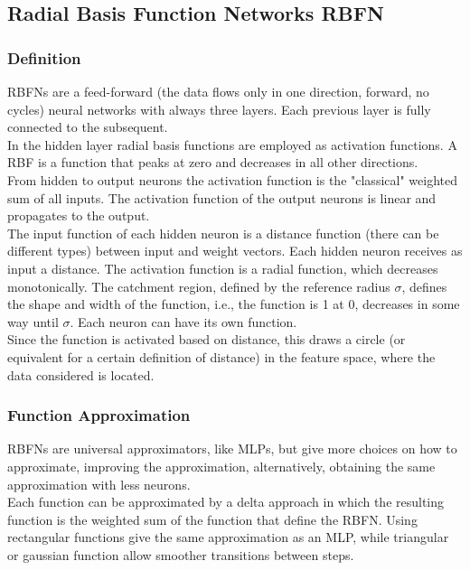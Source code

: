 \subsection{Radial Basis Function Networks RBFN}

\subsubsection{Definition}
RBFNs are a feed-forward (the data flows only in one direction, forward, no cycles) neural networks with always three layers. Each previous layer is fully connected to the subsequent.\\
In the hidden layer radial basis functions are employed as activation functions. A RBF is a function that peaks at zero and decreases in all other directions.\\

From hidden to output neurons the activation function is the "classical" weighted sum of all inputs. The activation function of the output neurons is linear and propagates to the output.\\ 

The input function of each hidden neuron is a distance function (there can be different types) between input and weight vectors. Each hidden neuron receives as input a distance. The activation function is a radial function, which decreases monotonically. The catchment region, defined by the reference radius $\sigma$, defines the shape and width of the function, i.e., the function is 1 at 0, decreases in some way until $\sigma$. Each neuron can have its own function.\\ 
Since the function is activated based on distance, this draws a circle (or equivalent for a certain definition of distance) in the feature space, where the data considered is located.\\

\subsubsection{Function Approximation}
RBFNs are universal approximators, like MLPs, but give more choices on how to approximate, improving the approximation, alternatively, obtaining the same approximation with less neurons.\\

Each function can be approximated by a delta approach in which the resulting function is the weighted sum of the function that define the RBFN. Using rectangular functions give the same approximation as an MLP, while triangular or gaussian function allow smoother transitions between steps.\\

